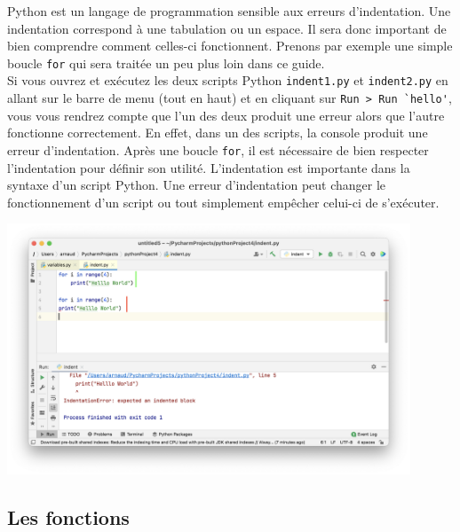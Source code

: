 Python est un langage de programmation sensible aux erreurs d'indentation. Une indentation correspond à une tabulation ou un espace. Il sera donc important de bien comprendre comment celles-ci fonctionnent. Prenons par exemple une simple boucle \lstinline{for} qui sera traitée un peu plus loin dans ce guide.\\

Si vous ouvrez et exécutez les deux scripts Python \lstinline{indent1.py} et \lstinline{indent2.py} en allant sur le barre de menu (tout en haut) et en cliquant sur \lstinline{Run > Run `hello'}, vous vous rendrez compte que l'un des deux produit une erreur alors que l'autre fonctionne correctement. En effet, dans un des scripts, la console produit une erreur d'indentation. Après une boucle \lstinline{for}, il est nécessaire de bien respecter l'indentation pour définir son utilité. L'indentation est importante dans la syntaxe d'un script Python. Une erreur d'indentation peut changer le fonctionnement d'un script ou tout simplement empêcher celui-ci de s'exécuter.



\begin{center}	
\includegraphics[width=12cm]{7}	
\end{center}


\subsection{Les fonctions}

